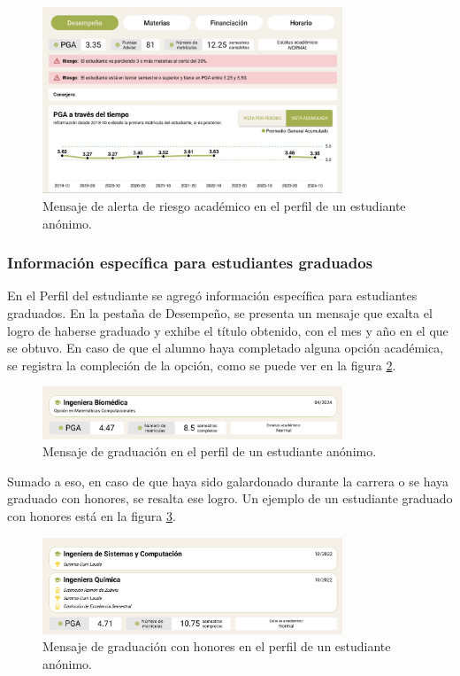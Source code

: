 \begin{figure}[H]
  \centering
  \includegraphics[width=0.8\textwidth]{img/nes/riesgo_academico.png}
  \caption{Mensaje de alerta de riesgo académico en el perfil de un estudiante anónimo.}
  \label{fig:riesgo_academico}
\end{figure}

\subsubsection{Información específica para estudiantes graduados}

En el Perfil del estudiante se agregó información específica para estudiantes graduados. En la pestaña de Desempeño, se presenta un mensaje que exalta el logro de haberse graduado y exhibe el título obtenido, con el mes y año en el que se obtuvo. En caso de que el alumno haya completado alguna opción académica, se registra la compleción de la opción, como se puede ver en la figura \ref{fig:graduado}.

\begin{figure}[H]
  \centering
  \includegraphics[width=0.8\textwidth]{img/nes/graduado.png}
  \caption{Mensaje de graduación en el perfil de un estudiante anónimo.}
  \label{fig:graduado}
\end{figure}

Sumado a eso, en caso de que haya sido galardonado durante la carrera o se haya graduado con honores, se resalta ese logro. Un ejemplo de un estudiante graduado con honores está en la figura \ref{fig:graduado_honores}.

\begin{figure}[H]
  \centering
  \includegraphics[width=0.8\textwidth]{img/nes/graduado_honores.png}
  \caption{Mensaje de graduación con honores en el perfil de un estudiante anónimo.}
  \label{fig:graduado_honores}
\end{figure}
